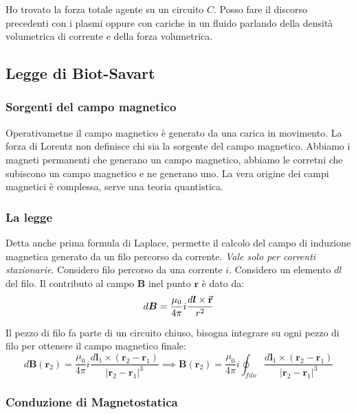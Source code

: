 \documentclass[a4paper]{scrarticle}
\begin{document}
Ho trovato la forza totale agente su un circuito $C$.
Posso fare il discorso precedenti con i plasmi oppure  con cariche in un fluido parlando della densità volumetrica di corrente e della forza volumetrica.

\subsection{Legge di Biot-Savart}
\subsubsection*{Sorgenti del campo magnetico}

Operativametne il campo magnetico è generato da una carica in movimento. La forza di Lorentz non definisce chi sia la sorgente del campo magnetico. Abbiamo i magneti permanenti che generano un campo magnetico, abbiamo le corretni che subiscono un campo magnetico e ne generano uno. La vera origine dei campi magnetici è complessa, serve una teoria quantistica.

\subsubsection*{La legge}

Detta anche prima formula di Laplace, permette il calcolo del campo di induzione magnetica generato da un filo percorso da corrente. \emph{Vale solo per correnti stazionarie}. 
Considero filo percorso da una corrente $i$. Considero un elemento $dl$ del filo. Il contributo al campo $\bm B$ inel punto $\bm r$ è dato da:
\begin{equation}
d \bm B = \frac{\mu_0}{4\pi}i \frac{d \bm l \times \va r}{r^2}
\end{equation}

Il pezzo di filo fa parte di un circuito chiuso, bisogna integrare su ogni pezzo di filo per ottenere il campo magnetico finale:
\begin{equation}
    d \bm B(\bm r_2) = \frac{\mu_0}{4\pi} i \frac{d \bm l_1 \times (\bm r_2 -\bm r_1)}{\left|\bm r_2 - \bm r_1\right|^3}
    \implies \bm B (\bm r_2) = \frac{\mu_0}{4 \pi}i \oint_{filo} \frac{d \bm l_1 \times (\bm r_2 -\bm r_1)}{\left|\bm r_2 - \bm r_1\right|^3}
\end{equation}

\subsubsection*{Conduzione di Magnetostatica}
\end{document}

